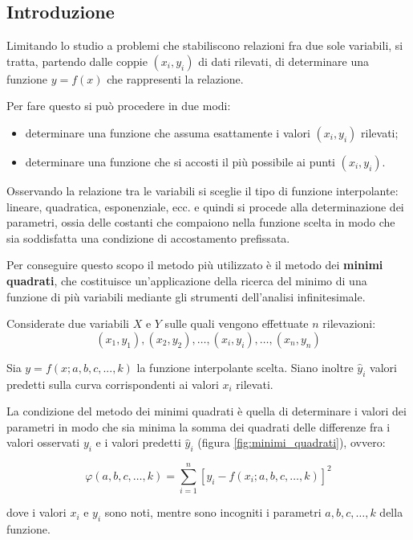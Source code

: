 \subsection{Introduzione}\label{ssec:regressione-introduzione}
Limitando lo studio a problemi che stabiliscono relazioni fra due sole variabili, si tratta, partendo dalle coppie $(x_i, y_i)$ di dati rilevati, di determinare una funzione $y=f(x)$ che rappresenti la relazione.

Per fare questo si può procedere in due modi:

\begin{itemize}
  \item determinare una funzione che assuma esattamente i valori $(x_i, y_i)$ rilevati;
  \item determinare una funzione che si accosti il più possibile ai punti $(x_i, y_i)$.
\end{itemize}

Osservando la relazione tra le variabili si sceglie il tipo di funzione interpolante: lineare, quadratica, esponenziale, ecc. e quindi si procede alla determinazione dei parametri, ossia delle costanti che compaiono nella funzione scelta in modo che sia soddisfatta una condizione di accostamento prefissata.

Per conseguire questo scopo il metodo più utilizzato è il metodo dei \textbf{minimi quadrati}, che costituisce un’applicazione della ricerca del minimo di una funzione di più variabili mediante gli strumenti dell’analisi infinitesimale.

Considerate due variabili $X$ e $Y$ sulle quali vengono effettuate $n$ rilevazioni: $$\left(x_{1}, y_{1}\right),\left(x_{2}, y_{2}\right), \ldots,\left(x_{i}, y_{i}\right), \ldots,\left(x_{n}, y_{n}\right)$$

Sia $y=f(x; a, b, c, ..., k)$ la funzione interpolante scelta. Siano inoltre $\hat{y}_{i}$ valori predetti sulla curva corrispondenti ai valori $x_i$ rilevati.

La condizione del metodo dei minimi quadrati è quella di determinare i valori dei parametri in modo che sia minima la somma dei quadrati delle differenze fra i valori osservati $y_i$ e i valori predetti $\hat{y}_i$ (figura \ref{fig:minimi_quadrati}), ovvero:

$$\varphi(a, b, c, \ldots, k)=\sum_{i=1}^{n}\left[y_{i}-f\left(x_{i} ; a, b, c, \ldots, k\right)\right]^{2}$$\smallskip

dove i valori $x_i$ e $y_i$ sono noti, mentre sono incogniti i parametri $a , b , c , … , k$ della funzione. \cite{excel_per_statistica_belluco}

